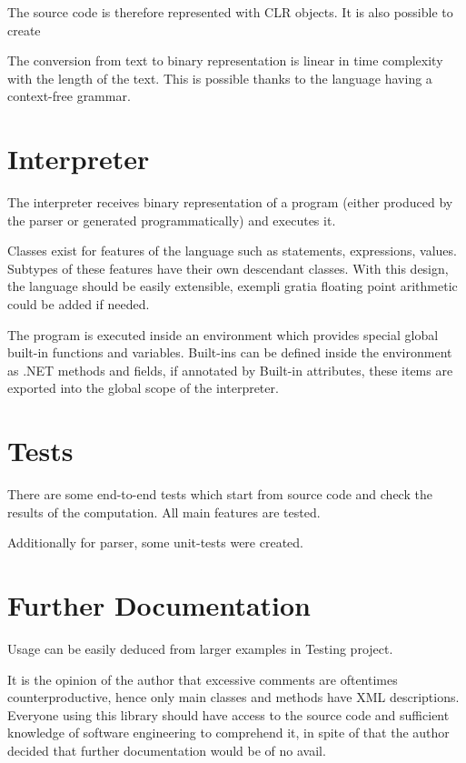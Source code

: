 \documentclass[a4paper,11pt,openany]{article}
\begin{document}
The source code is therefore represented with CLR objects. It is also possible to create 

The conversion from text to binary representation is linear in time complexity with the length of the text. This is possible thanks to the language having a context-free grammar.
	
\section*{Interpreter}

The interpreter receives binary representation of a program (either produced by the parser or generated programmatically) and executes it.

Classes exist for features of the language such as statements, expressions, values. Subtypes of these features have their own descendant classes. With this design, the language should be easily extensible, exempli gratia floating point arithmetic could be added if needed.

The program is executed inside an environment which provides special global built-in functions and variables. Built-ins can be defined inside the environment as .NET methods and fields, if annotated by Built-in attributes, these items are exported into the global scope of the interpreter.

\section*{Tests}

There are some end-to-end tests which start from source code and check the results of the computation. All main features are tested.

Additionally for parser, some unit-tests were created.

\section*{Further Documentation}

Usage can be easily deduced from larger examples in Testing project.

It is the opinion of the author that excessive comments are oftentimes counterproductive, hence only main classes and methods have XML descriptions. Everyone using this library should have access to the source code and sufficient knowledge of software engineering to comprehend it, in spite of that the author decided that further documentation would be of no avail.
\end{document}
